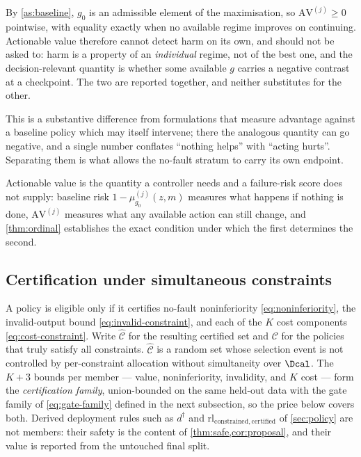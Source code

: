 By \cref{as:baseline}, $g_0$ is an admissible element of the maximisation, so
$\mathrm{AV}^{(j)}\ge0$ pointwise, with equality exactly when no available regime improves
on continuing.  Actionable value therefore cannot detect harm on its own, and
should not be asked to: harm is a property of an \emph{individual} regime, not
of the best one, and the decision-relevant quantity is whether some available
$g$ carries a negative contrast at a checkpoint.  The
two are reported together, and neither substitutes for the other.

This is a substantive difference from formulations that measure advantage
against a baseline policy which may itself intervene; there the analogous
quantity can go negative, and a single number conflates ``nothing helps'' with
``acting hurts''.  Separating them is what allows the no-fault stratum to carry
its own endpoint.

Actionable value is the quantity a controller needs and a failure-risk score
does not supply: baseline risk $1-\mu^{(j)}_{g_0}(z,m)$ measures what happens if
nothing is done, $\mathrm{AV}^{(j)}$ measures what any available action can still change,
and \cref{thm:ordinal} establishes the exact condition under which the first
determines the second.

\subsection{Certification under simultaneous constraints}

A policy is eligible only if it certifies no-fault noninferiority
\eqref{eq:noninferiority}, the invalid-output bound
\eqref{eq:invalid-constraint}, and each of the $K$ cost components
\eqref{eq:cost-constraint}.  Write $\widehat{\mathcal C}$ for the resulting
certified set and $\mathcal C$ for the policies that truly satisfy all
constraints.  $\widehat{\mathcal C}$ is a random set whose selection event is not
controlled by per-constraint allocation without simultaneity over $\Dcal$.  The
$K+3$ bounds per member --- value, noninferiority, invalidity, and $K$ cost ---
form the \emph{certification family}, union-bounded on the same held-out data
with the gate family of \cref{eq:gate-family} defined in the next subsection, so
the price below covers both.  Derived deployment rules such as $d^\dagger$ and
$\mathrm{rl}_{\mathrm{constrained,certified}}$ of \cref{sec:policy} are not
members: their safety is the content of \cref{thm:safe,cor:proposal}, and their
value is reported from the untouched final split.

